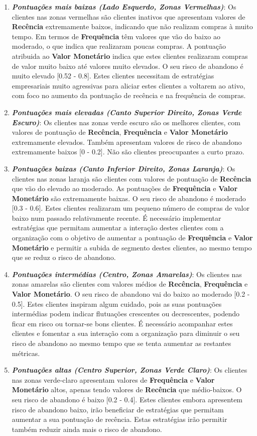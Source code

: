 \documentclass{easychair}
\begin{document}
\begin{enumerate}
	\item \textit{\textbf{Pontuações mais baixas (Lado Esquerdo, Zonas Vermelhas)}}: Os clientes nas zonas vermelhas são clientes inativos que apresentam valores de \textbf{Recência} extremamente baixos, indicando que não realizam compras à muito tempo. Em termos de \textbf{Frequência} têm valores que vão do baixo ao moderado, o que indica que realizaram poucas compras. A pontuação atribuida ao \textbf{Valor Monetário} indica que estes clientes realizaram compras de valor muito baixo até valores muito elevados. O seu risco de abandono é muito elevado [0.52 - 0.8]. Estes clientes necessitam de estratégias empresariais muito agressivas para aliciar estes clientes a voltarem ao ativo, com foco no aumento da pontuação de recência e na frequência de compras.
	\item \textit{\textbf{Pontuações mais elevadas (Canto Superior Direito, Zonas Verde Escuro)}}: Os clientes nas zonas verde escuro são os melhores clientes, com valores de pontuação de \textbf{Recência}, \textbf{Frequência} e \textbf{Valor Monetário} extremamente elevados. Também apresentam valores de risco de abandono extremamente baixos [0 - 0.2]. Não são clientes preocupantes a curto prazo.
	\item \textit{\textbf{Pontuações baixas (Canto Inferior Direito, Zonas Laranja)}}: Os clientes nas zonas laranja são clientes com valores de pontuação de \textbf{Recência} que vão do elevado ao moderado. As pontuações de \textbf{Frequência} e \textbf{Valor Monetário} são extremamente baixas. O seu risco de abandono é moderado [0.3 - 0.6]. Estes clientes realizaram um pequeno número de compras de valor baixo num passado relativamente recente. É necessário implementar estratégias que permitam aumentar a interação destes clientes com a organização com o objetivo de aumentar a pontuação de \textbf{Frequência} e \textbf{Valor Monetário} e permitir a subida de segmento destes clientes, ao mesmo tempo que se reduz o risco de abandono.
	\item \textit{\textbf{Pontuações intermédias (Centro, Zonas Amarelas)}}: Os clientes nas zonas amarelas são clientes com valores médios de \textbf{Recência}, \textbf{Frequência} e \textbf{Valor Monetário}. O seu risco de abandono vai do baixo ao moderado [0.2 - 0.5]. Estes clientes inspiram algum cuidado, pois as suas pontuações intermédias podem indicar flutuações crescentes ou decrescentes, podendo ficar em risco ou tornar-se bons clientes. É necessário acompanhar estes clientes e fomentar a sua interação com a organização para diminuir o seu risco de abandono ao mesmo tempo que se tenta aumentar as restantes métricas.
	\item \textit{\textbf{Pontuações altas (Centro Superior, Zonas Verde Claro)}}: Os clientes nas zonas verde-claro apresentam valores de \textbf{Frequência} e \textbf{Valor Monetário} altos, apenas tendo valores de \textbf{Recência} que médio-baixos. O seu risco de abandono é baixo [0.2 - 0.4]. Estes clientes embora apresentem risco de abandono baixo, irão beneficiar de estratégias que permitam aumentar a sua pontuação de recência. Estas estratégias irão permitir também reduzir ainda mais o risco de abandono.
\end{enumerate}
\end{document}
